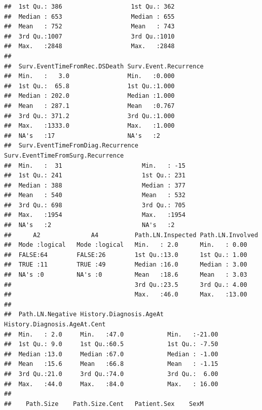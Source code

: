 \documentclass{article}\usepackage[]{graphicx}\usepackage[]{color}
\makeatletter
\newenvironment{kframe}{%
 \def\at@end@of@kframe{}%
 \ifinner\ifhmode%
  \def\at@end@of@kframe{\end{minipage}}%
  \begin{minipage}{\columnwidth}%
 \fi\fi%
 \def\FrameCommand##1{\hskip\@totalleftmargin \hskip-\fboxsep
 \colorbox{shadecolor}{##1}\hskip-\fboxsep
     \hskip-\linewidth \hskip-\@totalleftmargin \hskip\columnwidth}%
 \MakeFramed {\advance\hsize-\width
   \@totalleftmargin\z@ \linewidth\hsize
   \@setminipage}}%
 {\par\unskip\endMakeFramed%
 \at@end@of@kframe}
\newenvironment{knitrout}{}{} %
\makeatother
\begin{document}
\begin{knitrout}
\begin{kframe}
\begin{verbatim}
##  1st Qu.: 386                   1st Qu.: 362                  
##  Median : 653                   Median : 655                  
##  Mean   : 752                   Mean   : 743                  
##  3rd Qu.:1007                   3rd Qu.:1010                  
##  Max.   :2848                   Max.   :2848                  
##                                                               
##  Surv.EventTimeFromRec.DSDeath Surv.Event.Recurrence
##  Min.   :   3.0                Min.   :0.000        
##  1st Qu.:  65.8                1st Qu.:1.000        
##  Median : 202.0                Median :1.000        
##  Mean   : 287.1                Mean   :0.767        
##  3rd Qu.: 371.2                3rd Qu.:1.000        
##  Max.   :1333.0                Max.   :1.000        
##  NA's   :17                    NA's   :2            
##  Surv.EventTimeFromDiag.Recurrence Surv.EventTimeFromSurg.Recurrence
##  Min.   :  31                      Min.   : -15                     
##  1st Qu.: 241                      1st Qu.: 231                     
##  Median : 388                      Median : 377                     
##  Mean   : 540                      Mean   : 532                     
##  3rd Qu.: 698                      3rd Qu.: 705                     
##  Max.   :1954                      Max.   :1954                     
##  NA's   :2                         NA's   :2                        
##      A2              A4          Path.LN.Inspected Path.LN.Involved
##  Mode :logical   Mode :logical   Min.   : 2.0      Min.   : 0.00   
##  FALSE:64        FALSE:26        1st Qu.:13.0      1st Qu.: 1.00   
##  TRUE :11        TRUE :49        Median :16.0      Median : 3.00   
##  NA's :0         NA's :0         Mean   :18.6      Mean   : 3.03   
##                                  3rd Qu.:23.5      3rd Qu.: 4.00   
##                                  Max.   :46.0      Max.   :13.00   
##                                                                    
##  Path.LN.Negative History.Diagnosis.AgeAt History.Diagnosis.AgeAt.Cent
##  Min.   : 2.0     Min.   :47.0            Min.   :-21.00              
##  1st Qu.: 9.0     1st Qu.:60.5            1st Qu.: -7.50              
##  Median :13.0     Median :67.0            Median : -1.00              
##  Mean   :15.6     Mean   :66.8            Mean   : -1.15              
##  3rd Qu.:21.0     3rd Qu.:74.0            3rd Qu.:  6.00              
##  Max.   :44.0     Max.   :84.0            Max.   : 16.00              
##                                                                       
##    Path.Size    Path.Size.Cent   Patient.Sex    SexM        

\end{verbatim}
\end{kframe}
\end{knitrout}
\end{document}
